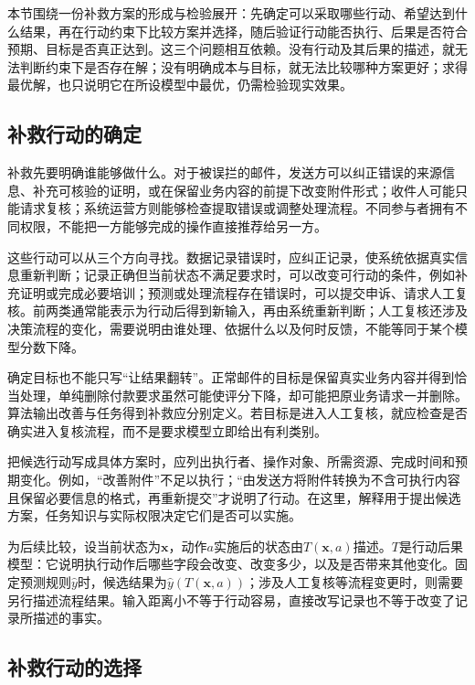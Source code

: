 本节围绕一份补救方案的形成与检验展开：先确定可以采取哪些行动、希望达到什么结果，再在行动约束下比较方案并选择，随后验证行动能否执行、后果是否符合预期、目标是否真正达到。这三个问题相互依赖。没有行动及其后果的描述，就无法判断约束下是否存在解；没有明确成本与目标，就无法比较哪种方案更好；求得最优解，也只说明它在所设模型中最优，仍需检验现实效果。

\subsection{补救行动的确定}
\label{sec:interpretability-recourse-target}

补救先要明确谁能够做什么。对于被误拦的邮件，发送方可以纠正错误的来源信息、补充可核验的证明，或在保留业务内容的前提下改变附件形式；收件人可能只能请求复核；系统运营方则能够检查提取错误或调整处理流程。不同参与者拥有不同权限，不能把一方能够完成的操作直接推荐给另一方。

这些行动可以从三个方向寻找。数据记录错误时，应纠正记录，使系统依据真实信息重新判断；记录正确但当前状态不满足要求时，可以改变可行动的条件，例如补充证明或完成必要培训；预测或处理流程存在错误时，可以提交申诉、请求人工复核。前两类通常能表示为行动后得到新输入，再由系统重新判断；人工复核还涉及决策流程的变化，需要说明由谁处理、依据什么以及何时反馈，不能等同于某个模型分数下降。

确定目标也不能只写“让结果翻转”。正常邮件的目标是保留真实业务内容并得到恰当处理，单纯删除付款要求虽然可能使评分下降，却可能把原业务请求一并删除。算法输出改善与任务得到补救应分别定义。若目标是进入人工复核，就应检查是否确实进入复核流程，而不是要求模型立即给出有利类别。

把候选行动写成具体方案时，应列出执行者、操作对象、所需资源、完成时间和预期变化。例如，“改善附件”不足以执行；“由发送方将附件转换为不含可执行内容且保留必要信息的格式，再重新提交”才说明了行动。在这里，解释用于提出候选方案，任务知识与实际权限决定它们是否可以实施。

为后续比较，设当前状态为$\bm{x}$，动作$a$实施后的状态由$T(\bm{x},a)$描述。$T$是行动后果模型：它说明执行动作后哪些字段会改变、改变多少，以及是否带来其他变化。固定预测规则$\hat y$时，候选结果为$\hat y(T(\bm{x},a))$；涉及人工复核等流程变更时，则需要另行描述流程结果。输入距离小不等于行动容易，直接改写记录也不等于改变了记录所描述的事实。

\subsection{补救行动的选择}
\label{sec:interpretability-recourse-action}

